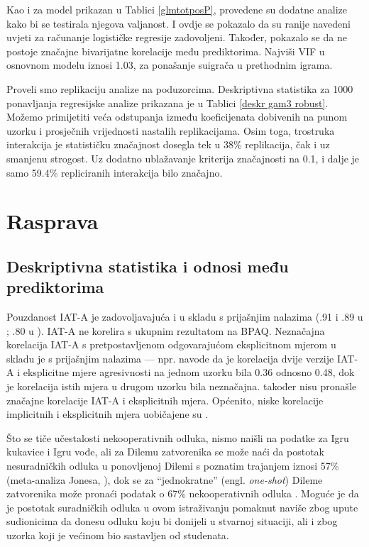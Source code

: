 \documentclass[a4paper, 12pt]{report}
\begin{document}
Kao i za model prikazan u Tablici \ref{glmtotposP}, provedene su dodatne analize
kako bi se testirala njegova valjanost. I ovdje se pokazalo da su ranije navedeni
uvjeti za računanje logističke regresije zadovoljeni. Također, pokazalo se da ne
postoje značajne bivarijatne korelacije među prediktorima. Najviši VIF u
osnovnom modelu iznosi 1.03, za ponašanje suigrača u prethodnim igrama.

Proveli smo replikaciju analize na poduzorcima. Deskriptivna statistika za
1000 ponavljanja regresijske analize prikazana je u Tablici \ref{deskr gam3 robust}. 
Možemo primijetiti veća odstupanja
između koeficijenata dobivenih na punom uzorku i prosječnih vrijednosti nastalih
replikacijama. Osim toga, trostruka interakcija  je statističku
značajnost dosegla tek u 38\% replikacija, čak i uz smanjenu strogost. Uz
dodatno ublažavanje kriterija značajnosti na 0.1, i dalje je samo 59.4\%
repliciranih interakcija bilo značajno. 

\section{Rasprava}

\subsection{Deskriptivna statistika i odnosi među prediktorima}

Pouzdanost IAT-A je zadovoljavajuća i u skladu s prijašnjim nalazima 
(.91 i .89 u \citealp{richetin2010predictive}; .80 u
\citealp{banse2015predicting}).
IAT-A ne korelira s ukupnim rezultatom na BPAQ. 
Neznačajna korelacija IAT-A s pretpostavljenom odgovarajućom eksplicitnom mjerom
u skladu je s prijašnjim nalazima --- npr. \citet{banse2015predicting}
navode da je korelacija dvije verzije IAT-A i eksplicitne mjere agresivnosti na
jednom uzorku bila 0.36 odnosno 0.48, dok je korelacija istih mjera u drugom
uzorku bila neznačajna. \citet{richetin2010predictive} također nisu
pronašle značajne korelacije IAT-A i eksplicitnih mjera.
Općenito, niske korelacije  implicitnih i eksplicitnih mjera uobičajene su 
\citep{uhlmann2012getting, mcclelland1989self}.

Što se tiče učestalosti nekooperativnih odluka, nismo naišli na podatke za
Igru kukavice i Igru vođe, ali za Dilemu zatvorenika se može naći 
da postotak nesuradničkih odluka u ponovljenoj Dilemi s poznatim
trajanjem iznosi 57\% (meta-analiza Jonesa, \citeyear{jones2008smarter}), dok se za
\enquote{jednokratne}
(engl. \emph{one-shot}) Dileme zatvorenika može pronaći podatak o 67\%
nekooperativnih odluka \citep{shafir1992thinking}. Moguće je da je postotak
suradničkih odluka u ovom istraživanju pomaknut naviše zbog upute sudionicima da
donesu odluku koju bi donijeli u stvarnoj situaciji, ali i zbog uzorka koji je
većinom bio sastavljen od studenata.
\end{document}
